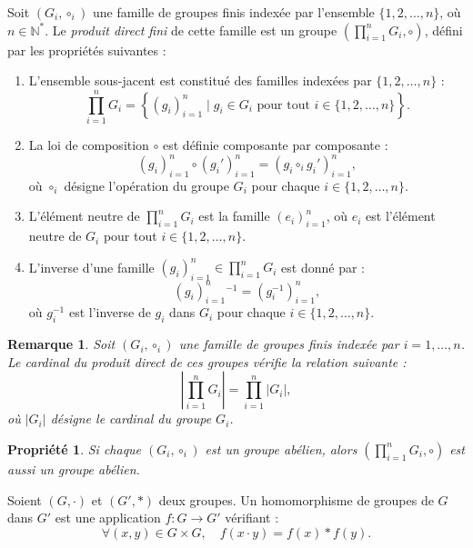 \documentclass[9pt]{beamer}
\newtheorem{propriety}{Propriété}
\newtheorem{remark}{Remarque}
\begin{document}
	\begin{frame}
		
		\begin{definition} 
Soit \( (G_i, \circ_i) \) une famille de groupes finis indexée par l'ensemble \( \{1, 2, \dots, n\} \), où \( n \in \mathbb{N}^{*} \). Le \textit{produit direct fini} de cette famille est un groupe \( \left( \prod_{i=1}^{n} G_i, \circ \right) \), défini par les propriétés suivantes : 
			\begin{enumerate}[label=\roman*)]
				\item L'ensemble sous-jacent est constitué des familles indexées par \( \{1, 2, \dots, n\} \) :  
				\[
				\prod_{i=1}^{n} G_i = \left\{ (g_i)_{i=1}^{n} \mid g_i \in G_i \text{ pour tout } i \in \{1, 2, \dots, n\} \right\}.
				\]
				\item La loi de composition \( \circ \) est définie composante par composante :  
				\[
				(g_i)_{i=1}^{n} \circ (g_i')_{i=1}^{n} = (g_i \circ_i g_i')_{i=1}^{n},
				\]  
				où \( \circ_i \) désigne l'opération du groupe \( G_i \) pour chaque \( i \in \{1, 2, \dots, n\} \).
				\item L'élément neutre de \( \prod_{i=1}^{n} G_i \) est la famille \( (e_i)_{i=1}^{n} \), où \( e_i \) est l'élément neutre de \( G_i \) pour tout \( i \in \{1, 2, \dots, n\} \).
				\item L'inverse d'une famille \( (g_i)_{i=1}^{n} \in \prod_{i=1}^{n} G_i \) est donné par :  
				\[
				(g_i)_{i=1}^{n}{}^{-1} = (g_i^{-1})_{i=1}^{n},
				\]  
				où \( g_i^{-1} \) est l'inverse de \( g_i \) dans \( G_i \) pour chaque \( i \in \{1, 2, \dots, n\} \).
			\end{enumerate}
		\end{definition}
	\end{frame}
	
	
	\begin{frame}
		
	\begin{remark}
Soit \( (G_i, \circ_i) \) une famille de groupes finis indexée par \( i = 1, \dots, n \).  
Le cardinal du produit direct de ces groupes vérifie la relation suivante :
		\[
		\left| \prod_{i=1}^{n} G_i \right| = \prod_{i=1}^{n} |G_i|,
		\]
		où \( |G_i| \) désigne le cardinal du groupe \( G_i \).
	\end{remark}
	

\begin{propriety}
Si chaque \( (G_i, \circ_i) \) est un groupe abélien, alors \( \left( \prod_{i=1}^{n} G_i, \circ \right) \) est aussi un groupe abélien.
\end{propriety}

		
		\begin{definition}
Soient \( (G, \cdot) \) et \( (G', *) \) deux groupes. Un homomorphisme de groupes de \( G \) dans \( G' \) est une application \( f : G \rightarrow G' \) vérifiant :
			\[
			\forall (x, y) \in G \times G, \quad f(x \cdot y) = f(x) * f(y).
			\]
		\end{definition}
		
		
		
	\end{frame}
	
\end{document}
